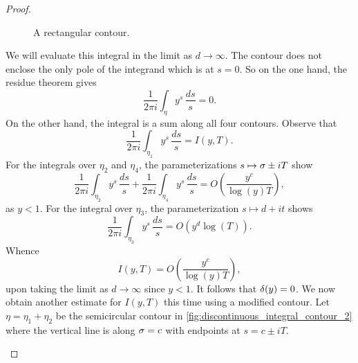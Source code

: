 \documentclass[12pt]{article}
\begin{document}
\begin{proof}
\begin{figure}[ht]
        \caption{A rectangular contour.}
        \label{fig:discontinuous_integral_contour_1}
      \end{figure}

      We will evaluate this integral in the limit as \(d \to \infty\). The contour does not enclose the only pole of the integrand which is at \(s = 0\). So on the one hand, the residue theorem gives 
      \[
        \frac{1}{2\pi i}\int_{\eta}y^{s}\,\frac{ds}{s} = 0.
      \]
      On the other hand, the integral is a sum along all four contours. Observe that
      \[
        \frac{1}{2\pi i}\int_{\eta_{1}}y^{s}\,\frac{ds}{s} = I(y,T).
      \]
      For the integrals over \(\eta_{2}\) and \(\eta_{4}\), the parameterizations \(s \mapsto \sigma\pm iT\) show
      \[
        \frac{1}{2\pi i}\int_{\eta_{2}}y^{s}\,\frac{ds}{s}+\frac{1}{2\pi i}\int_{\eta_{4}}y^{s}\,\frac{ds}{s} = O\left(\frac{y^{c}}{\log(y)T}\right),
      \]
      as \(y < 1\). For the integral over \(\eta_{3}\), the parameterization \(s \mapsto d+it\) shows
      \[
        \frac{1}{2\pi i}\int_{\eta_{3}}y^{s}\,\frac{ds}{s} = O\left(y^{d}\log(T)\right).
      \]
      Whence
      \[
        I(y,T) = O\left(\frac{y^{c}}{\log(y)T}\right),
      \]
      upon taking the limit as \(d \to \infty\) since \(y < 1\). It follows that \(\delta(y) = 0\). We now obtain another estimate for \(I(y,T)\) this time using a modified contour. Let \(\eta = \eta_{1}+\eta_{2}\) be the semicircular contour in \cref{fig:discontinuous_integral_contour_2} where the vertical line is along \(\sigma = c\) with endpoints at \(s = c\pm iT\).
      
      \begin{figure}[ht]
        \centering
\end{figure}
\end{proof}
\end{document}

